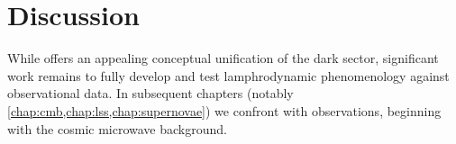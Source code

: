\section{Discussion}

While \rsvpabbr{} offers an appealing conceptual unification of the dark
sector, significant work remains to fully develop and test lamphrodynamic
phenomenology against observational data. In subsequent chapters (notably
\cref{chap:cmb,chap:lss,chap:supernovae}) we confront \rsvpabbr{} with
observations, beginning with the cosmic microwave background.

\clearpage

